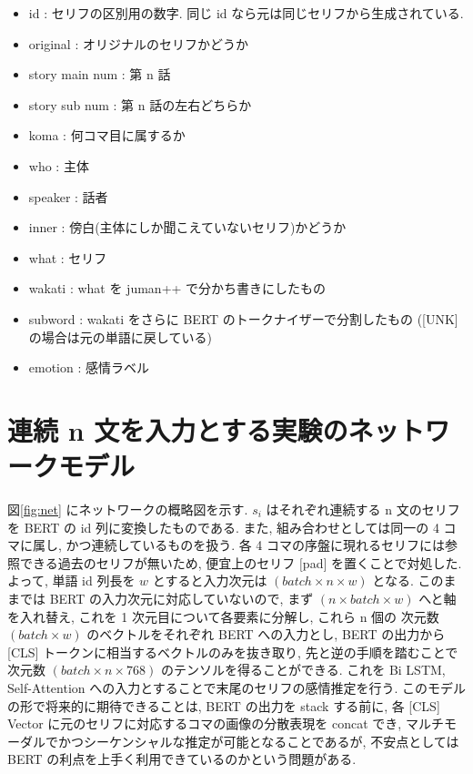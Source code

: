 \documentclass[twocolumn]{jarticle}     %
\begin{document}
\footnotesize
\begin{itemize}
  \item id : セリフの区別用の数字. 同じ id なら元は同じセリフから生成されている.
  \item original : オリジナルのセリフかどうか
  \item story main num : 第 n 話
  \item story sub num : 第 n 話の左右どちらか
  \item koma : 何コマ目に属するか
  \item who : 主体
  \item speaker : 話者
  \item inner : 傍白(主体にしか聞こえていないセリフ)かどうか
  \item what : セリフ
  \item wakati : what を juman++ で分かち書きにしたもの
  \item subword : wakati をさらに BERT のトークナイザーで分割したもの ([UNK] の場合は元の単語に戻している)
  \item emotion : 感情ラベル
\end{itemize}

\normalsize

\section{連続 n 文を入力とする実験のネットワークモデル}
図\ref{fig:net} にネットワークの概略図を示す. ${s_i}$ はそれぞれ連続する n 文のセリフを BERT の id 列に変換したものである. また, 組み合わせとしては同一の 4 コマに属し, かつ連続しているものを扱う. 各 4 コマの序盤に現れるセリフには参照できる過去のセリフが無いため, 便宜上のセリフ $[$pad$]$ を置くことで対処した. よって, 単語 id 列長を $w$ とすると入力次元は $(batch \times n \times w)$ となる. このままでは BERT の入力次元に対応していないので, まず $(n \times batch \times w)$ へと軸を入れ替え, これを 1 次元目について各要素に分解し, これら n 個の 次元数 $(batch \times w)$ のベクトルをそれぞれ BERT への入力とし, BERT の出力から [CLS] トークンに相当するベクトルのみを抜き取り, 先と逆の手順を踏むことで次元数 $(batch \times n \times 768)$ のテンソルを得ることができる. これを Bi LSTM, Self-Attention への入力とすることで末尾のセリフの感情推定を行う. このモデルの形で将来的に期待できることは, BERT の出力を stack する前に, 各 [CLS] Vector に元のセリフに対応するコマの画像の分散表現を concat でき, マルチモーダルでかつシーケンシャルな推定が可能となることであるが, 不安点としては BERT の利点を上手く利用できているのかという問題がある.
\end{document}
